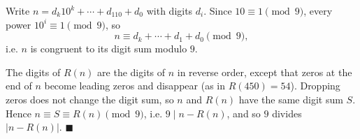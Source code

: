 Write $n=d_k10^k+\cdots+d_110+d_0$ with digits $d_i$. Since $10\equiv1\pmod9$, every power $10^i\equiv1\pmod9$, so
\[n\equiv d_k+\cdots+d_1+d_0\pmod9,\]
i.e. $n$ is congruent to its digit sum modulo $9$.

The digits of $R(n)$ are the digits of $n$ in reverse order, except that zeros at the end of $n$ become leading zeros and disappear (as in $R(450)=54$). Dropping zeros does not change the digit sum, so $n$ and $R(n)$ have the same digit sum $S$. Hence $n\equiv S\equiv R(n)\pmod9$, i.e. $9\mid n-R(n)$, and so $9$ divides $|n-R(n)|$. $\blacksquare$
